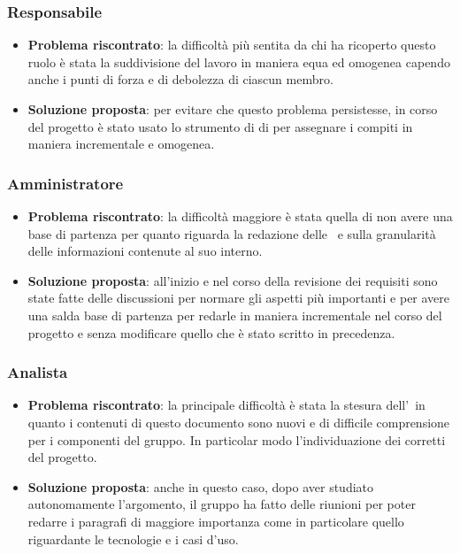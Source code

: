 		\subsubsection{Responsabile}
			\begin{itemize}
				\item \textbf{Problema riscontrato}: la difficoltà più sentita da chi ha ricoperto questo ruolo è stata la suddivisione del lavoro in maniera equa ed omogenea capendo anche i punti di forza e di debolezza di ciascun membro.
				\item \textbf{Soluzione proposta}: per evitare che questo problema persistesse, in corso del progetto è stato usato lo strumento di  di  per assegnare i compiti in maniera incrementale e omogenea.
			\end{itemize}

		\subsubsection{Amministratore}
			\begin{itemize}
				\item \textbf{Problema riscontrato}: la difficoltà maggiore è stata quella di non avere una base di partenza per quanto riguarda la redazione delle \NdP\ e sulla granularità delle informazioni contenute al suo interno.
				\item \textbf{Soluzione proposta}: all'inizio e nel corso della revisione dei requisiti sono state fatte delle discussioni per normare gli aspetti più importanti e per avere una salda base di partenza per redarle in maniera incrementale nel corso del progetto e senza modificare quello che è stato scritto in precedenza.
			\end{itemize}

		\subsubsection{Analista}
			\begin{itemize}
				\item \textbf{Problema riscontrato}: la principale difficoltà è stata la stesura dell'\AdR\ in quanto i contenuti di questo documento sono nuovi e di difficile comprensione per i componenti del gruppo. In particolar modo l'individuazione dei corretti  del progetto.
				\item \textbf{Soluzione proposta}: anche in questo caso, dopo aver studiato autonomamente l'argomento, il gruppo ha fatto delle riunioni per poter redarre i paragrafi di maggiore importanza come in particolare quello riguardante le tecnologie e i casi d'uso.
			\end{itemize}

